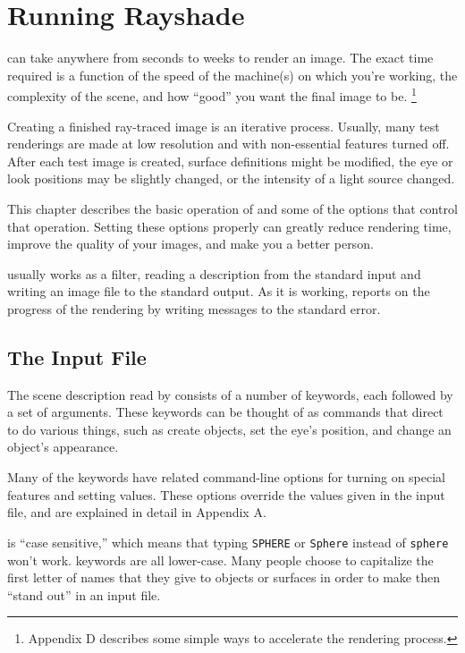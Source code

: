 \chapter{Running Rayshade}

{\Rayshade}
can take anywhere from seconds to weeks to render an image.  The exact
time required is a function of the speed of the
machine(s) on which
you're working, the complexity of the scene, and how ``good'' you want
the final image to be.  \footnote{Appendix D describes some simple
ways to accelerate the rendering process.}

Creating a finished ray-traced image is an iterative process.  Usually, many
test renderings are made at low resolution and with
non-essential features turned off.  After each test image is created,
surface definitions might be modified, the eye or look positions may be
slightly changed, or the intensity of a light source changed.

This chapter describes the basic operation of {\rayshade} and some of
the options that control that operation.
Setting these options properly can greatly reduce
rendering time, improve the quality of your images, and make you a better
person.

{\Rayshade} usually works as a filter, reading a description from
the standard input and writing
an image file to the standard output.  As it is working, {\rayshade} reports
on the progress of the rendering by writing messages to the standard
error.

\section{The Input File}

The scene description read by {\rayshade} consists of a number of
keywords, each followed by a set of arguments.  These keywords can
be thought of as commands that direct {\rayshade} to do various things,
such as create objects, set the eye's position, and change an object's
appearance.

Many of the keywords have related command-line options for turning
on special features and setting values.
These options override the values given in the input file,
and are explained in detail in Appendix A.

{\Rayshade} is ``case sensitive,'' which means that typing
{\tt SPHERE} or {\tt Sphere} instead of {\tt sphere} won't work.
{\Rayshade} keywords are all lower-case.  Many people choose to
capitalize the first letter of names that they give to objects
or surfaces in order to make then ``stand out'' in an input file.

